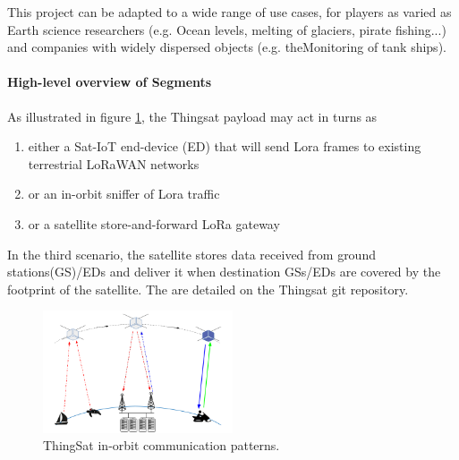 
This project can be adapted to a wide range of use cases, for players as varied
as Earth science researchers (e.g. Ocean levels, melting of glaciers, pirate
fishing...) and companies with widely dispersed objects (e.g. theMonitoring of
tank ships). 


\paragraph*{High-level overview of Segments}

As illustrated in figure \ref{fig:thingsat-comm}, the Thingsat payload may act in turns as 
\begin{enumerate}
    \item either a Sat-IoT end-device (ED) that will send Lora frames to existing terrestrial LoRaWAN networks
    \item or an in-orbit sniffer of Lora traffic
    \item or a satellite store-and-forward LoRa gateway
\end{enumerate}

In the third scenario, the satellite stores data received from ground
stations(GS)/EDs and deliver it when destination GSs/EDs are covered by the
footprint of the satellite. The %
are detailed on the Thingsat git repository. 


\begin{figure}[t]
    \centering
    \includegraphics[width=0.5\textwidth]{Figures/thingsat-dtn.png}
    \caption{ThingSat in-orbit communication patterns.}
    \label{fig:thingsat-comm}
\end{figure}

